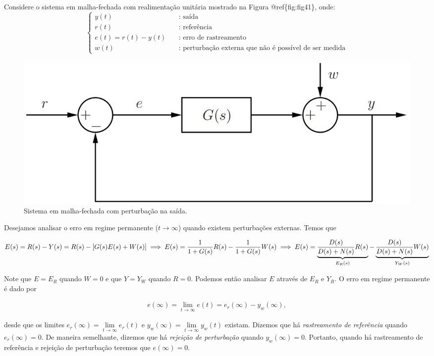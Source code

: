 \documentclass[
]{book}
\theoremstyle{definition}
\theoremstyle{definition}
\theoremstyle{definition}
\theoremstyle{remark}
\begin{document}
Considere o sistema em malha-fechada com realimentação unitária mostrado na Figura @ref\{fig:fig41\}, onde:
\[
\begin{cases}
  y(t) & \quad \text{: saída}\\
  r(t) & \quad \text{: referência}\\
  e(t) = r(t)-y(t) & \quad \text{: erro de rastreamento}\\
  w(t) &\quad \text{: perturbação externa que não é possível de ser medida}
\end{cases}
\]

\begin{figure}
\includegraphics[width=0.8\linewidth]{Imagens/Lab4/Apresentação/fig1} \caption{Sistema em malha-fechada com perturbação na saída.}\label{fig:fig41}
\end{figure}

Desejamos analisar o erro em regime permanente (\(t \to \infty\)) quando existem perturbações externas. Temos que

\[
E(s) = R(s) - Y(s) = R(s) - [G(s)E(s) + W(s)]\\
\implies E(s) = \frac {1}{1 + G(s)}R(s) - \frac {1}{1+G(s)}W(s) \\
\implies E(s) = \underbrace{\frac {D(s)}{D(s) + N(s)}R(s)}_{E_R(s)} - \underbrace{\frac {D(s)}{D(s) + N(s)}W(s)}_{Y_W(s)}
\]

Note que \(E = E_R\) quando \(W= 0\) e que \(Y = Y_W\) quando \(R=0\). Podemos então analisar \(E\) através de \(E_R\) e \(Y_R\). O erro em regime permanente é dado por

\begin{align}
e(\infty) = \lim\limits_{t \to \infty}{e(t)} = e_r(\infty) - y_w(\infty), \label{eq:eq41}
\end{align}

desde que os limites \(e_r(\infty) = \lim\limits_{t\to \infty}{e_r(t)}\) e \(y_w(\infty) = \lim\limits_{t \to \infty}{y_w(t)}\) existam. Dizemos que há \emph{rastreamento de referência} quando \(e_r(\infty) = 0\). De maneira semelhante, dizemos que há \emph{rejeição de perturbação} quando \(y_w(\infty) = 0\). Portanto, quando há rastreamento de referência e rejeição de perturbação teremos que \(e(\infty) = 0\).
\end{document}
